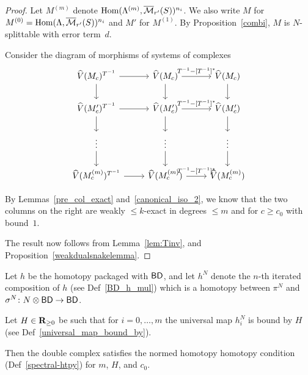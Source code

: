 \begin{proof}\leanok
  Let $M^{(m)}$ denote $\operatorname{Hom}(\Lambda^{(m)},\overline{\mathcal M}_{r'}(S))^{n_i}$.
  We also write $M$ for $M^{(0)} = \operatorname{Hom}(\Lambda,\overline{\mathcal M}_{r'}(S))^{n_i}$
  and $M'$ for $M^{(1)}$.
  By Proposition~\ref{combi}, $M$ is $N$-splittable with error term~$d$.

  Consider the diagram of morphisms of systems of complexes
  \[
    \begin{tikzcd}
      \hat V(M_c)^{T^{-1}} \rar\dar & \hat V(M_c) \rar["{T^{-1} - [T^{-1}]^*}"]\dar & \hat V(M_c) \dar \\
      \hat V(M'_c)^{T^{-1}} \rar\dar & \hat V(M'_c) \rar["{T^{-1} - [T^{-1}]^*}"]\dar & \hat V(M'_c) \dar \\
      \vdots \dar & \vdots \dar & \vdots \dar \\
      \hat V(M^{(m)}_c)^{T^{-1}} \rar & \hat V(M^{(m)}_c) \rar["{T^{-1} - [T^{-1}]^*}"] & \hat V(M^{(m)}_c)
    \end{tikzcd}
  \]

  By Lemmas~\ref{pre_col_exact} and~\ref{canonical_iso_2},
  we know that the two columns on the right are
  weakly $\le k$-exact in degrees $\le m$ and for $c \ge c_0$ with bound~$1$.

  The result now follows from Lemma~\ref{lem:Tinv}, and Proposition~\ref{weakdualsnakelemma}.
\end{proof}

\begin{proposition}
  \label{double-complex-htpy}
  \leanok
  Let $h$ be the homotopy packaged with $\mathsf{BD}$,
  and let $h^N$ denote the $n$-th iterated composition of $h$
  (see Def~\ref{BD_h_mul})
  which is a homotopy between
  $\pi^N$ and $\sigma^N \colon N \otimes \mathsf{BD} \to \mathsf{BD}$.

  Let $H \in \mathbf{R}_{\ge 0}$ be such that for $i = 0, \dots, m$
  the universal map $h^N_i$ is bound by $H$
  (see Def~\ref{universal_map_bound_by}).

  Then the double complex satisfies
  the normed homotopy homotopy condition (Def~\ref{spectral-htpy})
  for $m$, $H$, and $c_0$.
\end{proposition}

